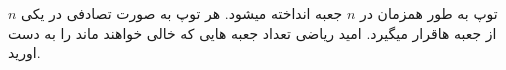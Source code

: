 \problem{}
$n$
توپ به طور همزمان در
$n$
جعبه انداخته میشود.
هر توپ به صورت تصادفی در یکی از جعبه هاقرار میگیرد. امید ریاضی تعداد جعبه هایی که خالی خواهند ماند را به دست اورید.

